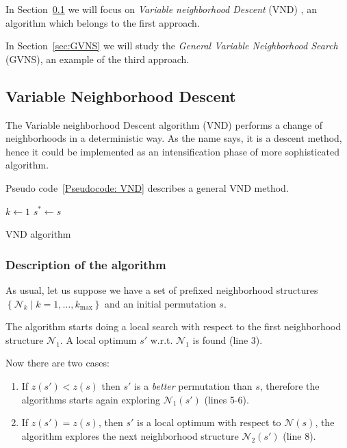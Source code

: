 In Section~\ref{sec:VND} we will focus on  \textit{Variable neighborhood Descent} (VND) , an algorithm which belongs to the first approach. 

In Section~\ref{sec:GVNS} we will study the \textit{General Variable Neighborhood Search} (GVNS), an example of the third approach.


\subsection{Variable Neighborhood Descent}
\label{sec:VND}

The Variable neighborhood Descent algorithm (VND) performs a change of neighborhoods in a deterministic way. As the name says, it is a descent method, hence it could be implemented as an intensification phase of more sophisticated algorithm.

Pseudo code~\ref{Pseudocode: VND} describes a general VND method.

\begin{algorithm}
	$k\gets 1$\;
$s^* \gets s$\;
	\caption{VND algorithm}
	\label{Pseudocode: VND}
	
\end{algorithm}


\subsubsection{Description of the algorithm}

As  usual, let us suppose we have a set of prefixed neighborhood structures $\left\{\mathcal N_k \mid k=1,\dots, k_\mathrm{max}\right\}$ and an initial permutation $s$.

The algorithm starts doing a local search with respect to the first neighborhood structure $\mathcal N_1$. A local optimum $s'$ w.r.t. $\mathcal N_1$ is found (line 3).

Now there are two cases:
\begin{enumerate}
	\item If $z(s')<z(s)$ then $s'$ is a \textit{better} permutation than $s$, therefore the algorithms starts again exploring $\mathcal N_1(s')$ (lines 5-6).
	\item If $z(s') = z(s)$, then $s'$ is a local optimum with respect to $\mathcal N(s)$, the algorithm explores the next neighborhood structure $\mathcal N_2(s')$ (line 8).
\end{enumerate}

